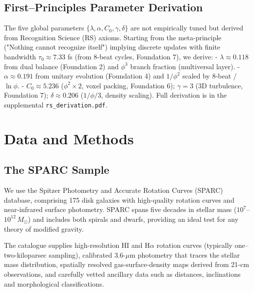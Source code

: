 \documentclass[twocolumn,prd,amsmath,amssymb,aps,superscriptaddress,nofootinbib]{revtex4-2}
\newcommand{\Msun}{M_{\odot}}
\begin{document}
\subsection{First--Principles Parameter Derivation}
\label{sec:derivation}

The five global parameters $\{\lambda,\alpha,C_0,\gamma,\delta\}$ are not empirically tuned but derived from Recognition Science (RS) axioms. Starting from the meta-principle ("Nothing cannot recognize itself") implying discrete updates with finite bandwidth $\tau_0 \approx 7.33$ fs (from 8-beat cycles, Foundation 7), we derive: \newline - $\lambda \approx 0.118$ from dual balance (Foundation 2) and $\phi^3$ branch fraction (multiversal layer). \newline - $\alpha \approx 0.191$ from unitary evolution (Foundation 4) and $1/\phi^2$ scaled by 8-beat / $\ln \phi$. \newline - $C_0 \approx 5.236$ ($\phi^2 \times 2$, voxel packing, Foundation 6); $\gamma = 3$ (3D turbulence, Foundation 7); $\delta \approx 0.206$ ($1/\phi / 3$, density scaling). \newline Full derivation is in the supplemental \texttt{rs_derivation.pdf}.

\section{Data and Methods}
\label{sec:data}

\subsection{The SPARC Sample}

We use the Spitzer Photometry and Accurate Rotation Curves (SPARC) database, comprising 175 disk galaxies with high-quality rotation curves and near-infrared surface photometry. SPARC spans five decades in stellar mass ($10^7$--$10^{12}\,\Msun$) and includes both spirals and dwarfs, providing an ideal test for any theory of modified gravity.
\cite{deBlok2010, Oman2015, Ren2019, Katz2017, Posti2020}

The catalogue supplies high-resolution HI and H$\alpha$ rotation curves (typically one–two-kiloparsec sampling), calibrated 3.6-$\mu$m photometry that traces the stellar mass distribution, spatially resolved gas-surface-density maps derived from 21-cm observations, and carefully vetted ancillary data such as distances, inclinations and morphological classifications.
\end{document}
